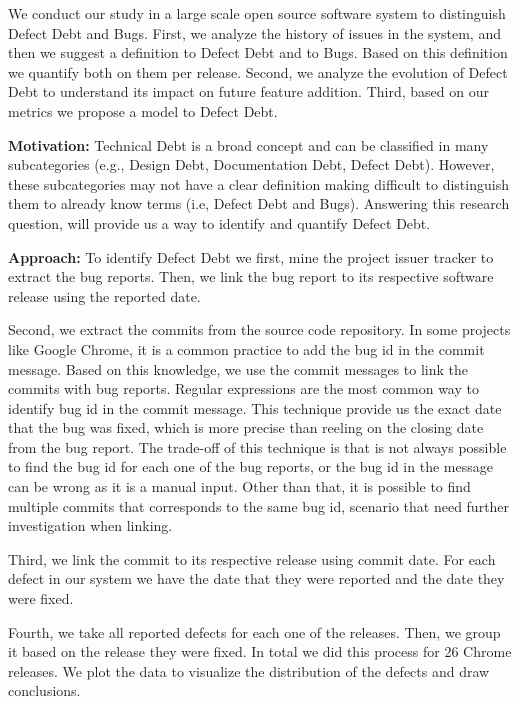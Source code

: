 We conduct our study in a large scale open source software system to distinguish Defect Debt and Bugs. First, we analyze the history of issues in the system, and then we suggest a definition to Defect Debt and to Bugs. Based on this definition we quantify  both on them per release. Second, we analyze the evolution of Defect Debt to understand its impact on future feature addition. Third, based on our metrics we propose a model to Defect Debt.

\vspace{3mm}
\noindent\rqi
\vspace{3mm}

\noindent\textbf{Motivation:} Technical Debt is a broad concept and can be classified in many subcategories (e.g., Design Debt, Documentation Debt, Defect Debt). However, these subcategories may not have a clear definition making difficult to distinguish them to already know terms (i.e, Defect Debt and Bugs). Answering this research question, will provide us a way to identify and quantify Defect Debt. 

\vspace{1mm}
\noindent\textbf{Approach:} To identify Defect Debt we first, mine the project issuer tracker to extract the bug reports. Then, we link the bug report to its respective software release using the reported date. 

Second, we extract the commits from the source code repository. In some projects like Google Chrome, it is a common practice to add the bug id in the commit message. Based on this knowledge, we use the commit messages to link the commits with bug reports. Regular expressions are the most common way to identify bug id in the commit message. This technique provide us the exact date that the bug was fixed, which is more precise than reeling on the closing date from the bug report. The trade-off of this technique is that is not always possible to find the bug id for each one of the bug reports, or the bug id in the message can be wrong as it is a manual input. Other than that, it is possible to find multiple commits that corresponds to the same bug id, scenario that need further investigation when linking. 

Third, we link the commit to its respective release using commit date. For each defect in our system we have the date that they were reported and the date they were fixed. 

Fourth, we take all reported defects for each one of the releases. Then, we group it based on the release they were fixed. In total we did this process for 26 Chrome releases. We plot the data to visualize the distribution of the defects and draw conclusions. 

